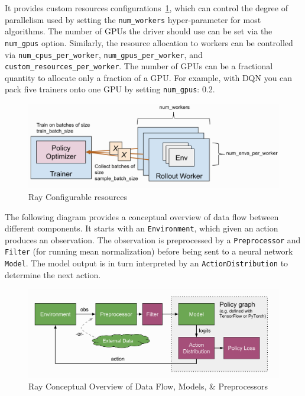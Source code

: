 It provides custom resources configurations~\ref{fig:ray_config}, which can control the degree of parallelism used by setting the \colorbox{gray!20}{\texttt{num\_workers}} hyper-parameter for most algorithms. The number of GPUs the driver should use can be set via the \colorbox{gray!20}{\texttt{num\_gpus}} option. Similarly, the resource allocation to workers can be controlled via \colorbox{gray!20}{\texttt{num\_cpus\_per\_worker}}, \colorbox{gray!20}{\texttt{num\_gpus\_per\_worker}}, and \colorbox{gray!20}{\texttt{custom\_resources\_per\_worker}}. The number of GPUs can be a fractional quantity to allocate only a fraction of a GPU. For example, with DQN you can pack five trainers onto one GPU by setting \colorbox{gray!20}{\texttt{num\_gpus}: 0.2}.
\begin{figure}[!htb]
	\centering
	\includegraphics[width=\textwidth]{figures/architecture/ray_config.png}
	\caption{Ray Configurable resources}
	\label{fig:ray_config}
\end{figure}

The following diagram provides a conceptual overview of data flow between different components. It starts with an \colorbox{gray!20}{\texttt{Environment}}, which given an action produces an observation. The observation is preprocessed by a \colorbox{gray!20}{\texttt{Preprocessor}} and \colorbox{gray!20}{\texttt{Filter}} (for running mean normalization) before being sent to a neural network \colorbox{gray!20}{\texttt{Model}}. The model output is in turn interpreted by an \colorbox{gray!20}{\texttt{ActionDistribution}} to determine the next action.
\begin{figure}[!htb]
	\centering
	\includegraphics[width=\textwidth]{figures/architecture/ray_loop.png}
	\caption{Ray Conceptual Overview of Data Flow, Models, \& Preprocessors}
	\label{fig:ray_loop}
\end{figure}

